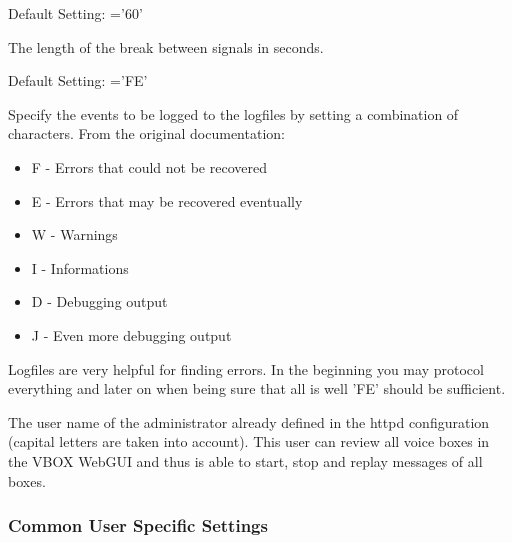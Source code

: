 \begin{description}


    Default Setting: ='60'
    
    The length of the break between signals in seconds.


    Default Setting: ='FE'

    Specify the events to be logged to the logfiles by setting a combination of characters.
    From the original documentation:
    \begin{itemize}
        \item F - Errors that could not be recovered
        \item E - Errors that may be recovered eventually
        \item W - Warnings
        \item I - Informations
        \item D - Debugging output
        \item J - Even more debugging output
    \end{itemize}

    Logfiles are very helpful for finding errors. In the beginning you may protocol everything
    and later on when being sure that all is well 'FE' should be sufficient.


    The user name of the administrator already defined in the httpd configuration
    (capital letters are taken into account). This user can review all voice boxes
    in the VBOX WebGUI and thus is able to start, stop and replay messages of all boxes.

\end{description}

\subsubsection{Common User Specific Settings}

